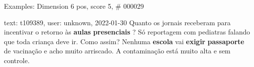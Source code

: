 \begin{frame}{Examples: Dimension 6 pos, score 5, \# 000029}
\footnotesize
\begin{exampleblock}{text: t109389, user: unknown, 2022-01-30}
Quanto os jornais receberam para incentivar o retorno às \textbf{aulas} 
\textbf{presenciais} ? Só reportagem com pediatras falando que toda criança 
deve ir. Como assim? Nenhuma \textbf{escola} vai \textbf{exigir} 
\textbf{passaporte} de vacinação e acho muito arriscado. A contaminação está 
muito alta e sem controle. 
\end{exampleblock}
\end{frame}
